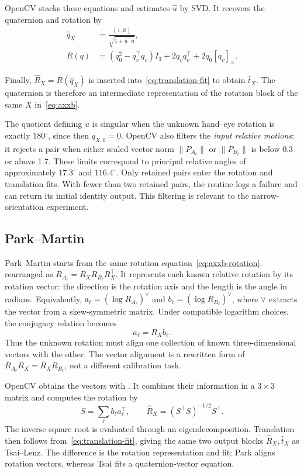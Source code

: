\documentclass[12pt,a4paper]{article}
\newcommand{\crossmat}[1]{[#1]_{\times}}
\newcommand{\code}[1]{\texttt{\detokenize{#1}}}
\begin{document}
\begin{samepage}
OpenCV stacks these equations and estimates $\widehat u$ by SVD. It recovers the quaternion and rotation by
\begin{align}
\widehat q_X&=\frac{(1,\widehat u)}{\sqrt{1+\widehat u^\top\widehat u}},\label{eq:tsai-recovery}\\
R(q)&=(q_0^2-q_v^\top q_v)I_3+2q_vq_v^\top+2q_0\crossmat{q_v}.
\label{eq:quaternion-rotation}
\end{align}
\end{samepage}
Finally, $\widehat R_X=R(\widehat q_X)$ is inserted into~\eqref{eq:translation-fit} to obtain $\widehat t_X$. The quaternion is therefore an intermediate representation of the rotation block of the same $X$ in~\eqref{eq:axxb}.

The quotient defining $u$ is singular when the unknown hand--eye rotation is exactly $180^\circ$, since then $q_{X,0}=0$. OpenCV also filters the \emph{input relative motions}: it rejects a pair when either scaled vector norm $\|P_{A_\ell}\|$ or $\|P_{B_\ell}\|$ is below 0.3 or above 1.7. These limits correspond to principal relative angles of approximately $17.3^\circ$ and $116.4^\circ$. Only retained pairs enter the rotation and translation fits. With fewer than two retained pairs, the routine logs a failure and can return its initial identity output. This filtering is relevant to the narrow-orientation experiment. \cite{tsai,opencvsource}

\subsection{Park--Martin}
Park--Martin starts from the same rotation equation~\eqref{eq:axxb-rotation}, rearranged as $R_{A_\ell}=R_XR_{B_\ell}R_X^\top$. It represents each known relative rotation by its rotation vector: the direction is the rotation axis and the length is the angle in radians. Equivalently, $a_\ell=(\log R_{A_\ell})^\vee$ and $b_\ell=(\log R_{B_\ell})^\vee$, where $\vee$ extracts the vector from a skew-symmetric matrix. Under compatible logarithm choices, the conjugacy relation becomes
\begin{equation}\label{eq:park}
a_\ell=R_Xb_\ell.
\end{equation}
Thus the unknown rotation must align one collection of known three-dimensional vectors with the other. The vector alignment is a rewritten form of $R_{A_\ell}R_X=R_XR_{B_\ell}$, not a different calibration task.

OpenCV obtains the vectors with \code{Rodrigues}. It combines their information in a $3\times3$ matrix and computes the rotation by
\begin{equation}\label{eq:park-recovery}
S=\sum_\ell b_\ell a_\ell^\top,\qquad
\widehat R_X=(S^\top S)^{-1/2}S^\top.
\end{equation}
The inverse square root is evaluated through an eigendecomposition. Translation then follows from~\eqref{eq:translation-fit}, giving the same two output blocks $\widehat R_X,\widehat t_X$ as Tsai--Lenz. The difference is the rotation representation and fit: Park aligns rotation vectors, whereas Tsai fits a quaternion-vector equation.
\end{document}
